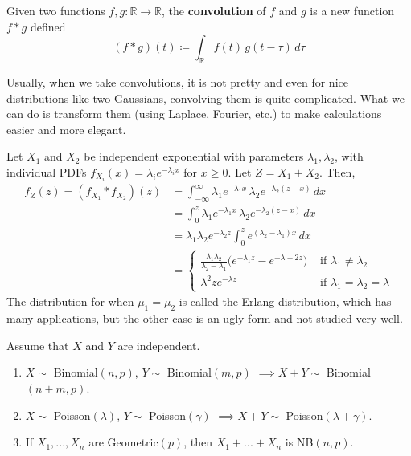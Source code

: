 \documentclass{article}
\begin{document}
      \begin{definition}[Convolution]
        Given two functions $f, g: \mathbb{R} \longrightarrow \mathbb{R}$, the \textbf{convolution} of $f$ and $g$ is a new function $f \ast g$ defined  
        \begin{equation}
          (f \ast g) (t) \coloneqq \int_\mathbb{R} f(t)\, g(t - \tau) \, d \tau
        \end{equation}
      \end{definition}

      Usually, when we take convolutions, it is not pretty and even for nice distributions like two Gaussians, convolving them is quite complicated. What we can do is transform them (using Laplace, Fourier, etc.) to make calculations easier and more elegant. 

      \begin{example}
        Let $X_1$ and $X_2$ be independent exponential with parameters $\lambda_1, \lambda_2$, with individual PDFs $f_{X_i} (x) = \lambda_i e^{-\lambda_i x}$ for $x \geq 0$. Let $Z = X_1 + X_2$. Then, 
        \begin{align*}
          f_Z (z) = (f_{X_1} \ast f_{X_2})(z) & = \int_{-\infty}^\infty \lambda_1 e^{-\lambda_1 x} \, \lambda_2 e^{-\lambda_2 (z -x)} \, dx \\
          & = \int_{0}^z \lambda_1 e^{-\lambda_1 x} \, \lambda_2 e^{-\lambda_2 (z -x)} \, dx \\ 
          & = \lambda_1 \lambda_2 e^{-\lambda_2 z} \int_0^z e^{(\lambda_2 - \lambda_1) x}\,dx \\
          & = \begin{cases} \frac{\lambda_1 \lambda_2}{\lambda_2 - \lambda_1} \big( e^{-\lambda_1 z} - e^{-\lambda-2 z} \big) & \text{ if } \lambda_1 \neq \lambda_2 \\
          \lambda^2 z e^{-\lambda z} & \text{ if } \lambda_1 = \lambda_2 = \lambda \end{cases} 
        \end{align*}
        The distribution for when $\mu_1 = \mu_2$ is called the Erlang distribution, which has many applications, but the other case is an ugly form and not studied very well. 
      \end{example}

      \begin{theorem}
        Assume that $X$ and $Y$ are independent. 
        \begin{enumerate}
          \item $X \sim$ Binomial$(n, p)$, $Y \sim$ Binomial$(m, p)$ $\implies X + Y \sim$ Binomial$(n + m, p)$. 
          \item $X \sim$ Poisson$(\lambda)$, $Y \sim$ Poisson$(\gamma)$ $\implies X + Y \sim$ Poisson$(\lambda + \gamma)$. 
          \item If $X_1, ..., X_n$ are Geometric$(p)$, then $X_1 + ... + X_n$ is NB$(n, p)$. 
        \end{enumerate}
      \end{theorem}
\end{document}

